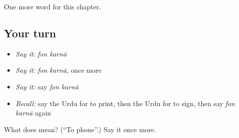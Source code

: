\begin{grammarlens}[title={What you've built}]
One more word for this chapter.
\end{grammarlens}

\subsection*{Your turn}
\begin{itemize}
\raggedright
  \item \emph{Say it:} \emph{fon karnā}
  \item \emph{Say it:} \emph{fon karnā}, once more
  \item \emph{Say it:} say \emph{fon karnā}
  \item \emph{Recall:} say the Urdu for to print, then the Urdu for to sign, then say \emph{fon karnā} again
\end{itemize}

\begin{tcolorbox}[breakable,colback=teal!4,colframe=teal!35!black,title={Before you move on}]
What does   mean? (\textquotedblleft{}To phone\textquotedblright{}.) Say it once more.
\end{tcolorbox}
